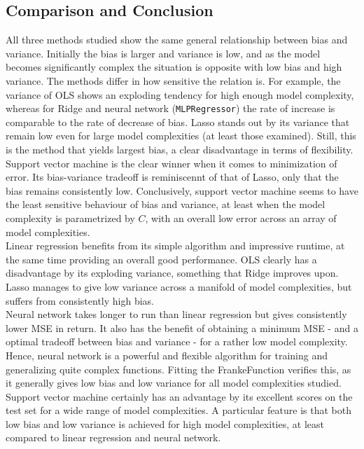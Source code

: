 \documentclass[a4paper]{article}
\def\code#1{\texttt{#1}}
\begin{document}
	\subsection*{Comparison and Conclusion}
	All three methods studied show the same general relationship between bias and variance. Initially the bias is larger and variance is low, and as the model becomes significantly complex the situation is opposite with low bias and high variance. The methods differ in how sensitive the relation is. For example, the variance of OLS shows an exploding tendency for high enough model complexity, whereas for Ridge and neural network (\code{MLPRegressor}) the rate of increase is comparable to the rate of decrease of bias. Lasso stands out by its variance that remain low even for large model complexities (at least those examined). Still, this is the method that yields largest bias, a clear disadvantage in terms of flexibility. Support vector machine is the clear winner when it comes to minimization of error. Its bias-variance tradeoff is reminiscennt of that of Lasso, only that the bias remains consistently low. Conclusively, support vector machine seems to have the least sensitive behaviour of bias and variance, at least when the model complexity is parametrized by $C$, with an overall low error across an array of model complexities. \\
	
	Linear regression benefits from its simple algorithm and impressive runtime, at the same time providing an overall good performance. OLS clearly has a disadvantage by its exploding variance, something that Ridge improves upon. Lasso manages to give low variance across a manifold of model complexities, but suffers from consistently high bias. \\
	
	Neural network takes longer to run than linear regression but gives consistently lower MSE in return. It also has the benefit of obtaining a minimum MSE - and a optimal tradeoff between bias and variance - for a rather low model complexity. Hence, neural network is a powerful and flexible algorithm for training and generalizing quite complex functions. Fitting the FrankeFunction verifies this, as it generally gives low bias and low variance for all model complexities studied. \\
	
	Support vector machine certainly has an advantage by its excellent scores on the test set for a wide range of model complexities. A particular feature is that both low bias and low variance is achieved for high model complexities, at least compared to linear regression and neural network.
	
\end{document}

